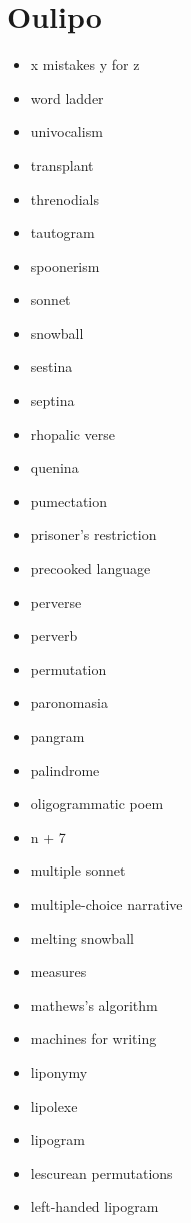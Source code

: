 
\chapter{Oulipo}
\label{app:oulipo}


\begin{multicols}{3}
\begin{itemize}
  \item x mistakes y for z
  \item word ladder
  \item univocalism
  \item transplant
  \item threnodials
  \item tautogram
  \item spoonerism
  \item sonnet
  \item snowball
  \item sestina
  \item septina
  \item rhopalic verse
  \item quenina
  \item pumectation
  \item prisoner's restriction
  \item precooked language
  \item perverse
  \item perverb
  \item permutation
  \item paronomasia
  \item pangram
  \item palindrome
  \item oligogrammatic poem
  \item n + 7
  \item multiple sonnet
  \item multiple-choice narrative
  \item melting snowball
  \item measures
  \item mathews's algorithm
  \item machines for writing
  \item liponymy
  \item lipolexe
  \item lipogram
  \item lescurean permutations
  \item left-handed lipogram

\end{itemize}
\end{multicols}

